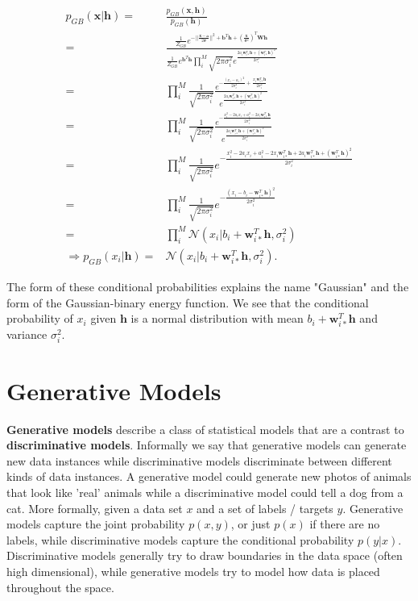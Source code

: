 \documentclass[%
oneside,                 %
final,                   %
10pt]{article}
\begin{document}
\begin{align}
	p_{GB} (\bm{x}|\bm{h})
	=& \frac{p_{GB} (\bm{x}, \bm{h})}{p_{GB} (\bm{h})} \nonumber \\
	=& \frac{\frac{1}{Z_{GB}} e^{-\vert\vert\frac{\bm{x} -\bm{a}}{2\bm{\sigma}}\vert\vert^2 + \bm{b}^T \bm{h} 
	+ (\frac{\bm{x}}{\bm{\sigma}^2})^T \bm{W}\bm{h}}}
	{\frac{1}{Z_{GB}} e^{\bm{b}^T \bm{h}} \prod_i^M
	\sqrt{2\pi \sigma_i^2}
	e^{\frac{2a_i \bm{w}_{i\ast}^T \bm{h} +(\bm{w}_{i\ast}^T \bm{h})^2 }{2\sigma_i^2}}}
	\nonumber \\
	=& \prod_i^M \frac{1}{\sqrt{2\pi \sigma_i^2}}
	\frac{e^{- \frac{(x_i - a_i)^2}{2\sigma_i^2} + \frac{x_i \bm{w}_{i\ast}^T \bm{h}}{2\sigma_i^2} }}
	{e^{\frac{2a_i \bm{w}_{i\ast}^T \bm{h} +(\bm{w}_{i\ast}^T \bm{h})^2 }{2\sigma_i^2}}}
	\nonumber \\
	=& \prod_i^M \frac{1}{\sqrt{2\pi \sigma_i^2}}
	\frac{e^{-\frac{x_i^2 - 2a_i x_i + a_i^2 - 2x_i \bm{w}_{i\ast}^T\bm{h} }{2\sigma_i^2} } }
	{e^{\frac{2a_i \bm{w}_{i\ast}^T \bm{h} +(\bm{w}_{i\ast}^T \bm{h})^2 }{2\sigma_i^2}}}
	\nonumber \\
	=& \prod_i^M \frac{1}{\sqrt{2\pi \sigma_i^2}}
	e^{- \frac{x_i^2 - 2a_i x_i + a_i^2 - 2x_i \bm{w}_{i\ast}^T\bm{h}
	+ 2a_i \bm{w}_{i\ast}^T \bm{h} +(\bm{w}_{i\ast}^T \bm{h})^2}
	{2\sigma_i^2} }
	\nonumber \\
	=& \prod_i^M \frac{1}{\sqrt{2\pi \sigma_i^2}}
	e^{ - \frac{(x_i - b_i - \bm{w}_{i\ast}^T \bm{h})^2}{2\sigma_i^2}} \nonumber \\
	=& \prod_i^M \mathcal{N}
	(x_i | b_i + \bm{w}_{i\ast}^T \bm{h}, \sigma_i^2) \\
	\Rightarrow p_{GB} (x_i|\bm{h}) =& \mathcal{N}
	(x_i | b_i + \bm{w}_{i\ast}^T \bm{h}, \sigma_i^2) .
\end{align}

The form of these conditional probabilities explains the name
"Gaussian" and the form of the Gaussian-binary energy function. We see
that the conditional probability of $x_i$ given $\bm{h}$ is a normal
distribution with mean $b_i + \bm{w}_{i\ast}^T \bm{h}$ and variance
$\sigma_i^2$.

\section{Generative Models}
\textbf{Generative models} describe a class of statistical models that are a contrast
to \textbf{discriminative models}. Informally we say that generative models can
generate new data instances while discriminative models discriminate between
different kinds of data instances. A generative model could generate new photos
of animals that look like 'real' animals while a discriminative model could tell
a dog from a cat. More formally, given a data set $x$ and a set of labels /
targets $y$. Generative models capture the joint probability $p(x, y)$, or
just $p(x)$ if there are no labels, while discriminative models capture the
conditional probability $p(y | x)$. Discriminative models generally try to draw
boundaries in the data space (often high dimensional), while generative models
try to model how data is placed throughout the space.
\end{document}
